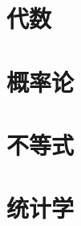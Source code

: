 \documentclass[11pt, a4paper, twoside, openany, UTF8]{ctexbook}
\begin{document}
\maketitle
\frontmatter	
\listoftodos

\tableofcontents

\mainmatter
\part{代数}


%
%
%
%
%
%
%
%
%
%
\part{概率论}



%
%
\part{不等式}

\part{统计学}


%
%

%

%
%
\end{document}
